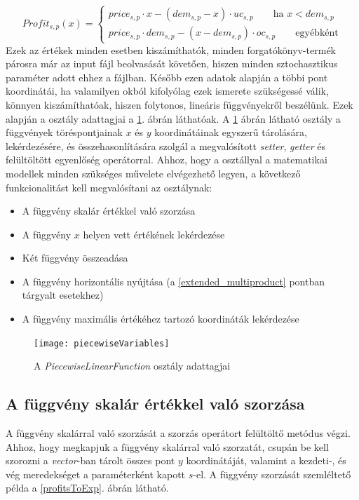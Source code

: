 \begin{equation*}
Profit_{s,p}(x)= \begin{cases}
            price_{s,p}\cdot x-(dem_{s,p}-x) \cdot uc_{s,p}\qquad \text{ha } x<dem_{s,p} \\
            price_{s,p} \cdot dem_{s,p}-(x-dem_{s,p}) \cdot oc_{s,p}\qquad \text{egyébként}
       \end{cases}
\end{equation*}
Ezek az értékek minden esetben kiszámíthatók, minden forgatókönyv-termék párosra már az input fájl beolvasását követően, hiszen minden sztochasztikus paraméter adott ehhez a fájlban.
Később ezen adatok alapján a többi pont koordinátái, ha valamilyen okból kifolyólag ezek ismerete szükségessé válik, könnyen kiszámíthatóak, hiszen folytonos, lineáris függvényekről beszélünk.
Ezek alapján a  osztály adattagjai a \ref{piecewise_variables}. ábrán láthatóak.
A \ref{piecewise_variables} ábrán látható  osztály a függvények töréspontjainak $x$ és $y$ koordinátáinak egyszerű tárolására, lekérdezésére, és összehasonlítására szolgál a megvalósított \textit{setter}, \textit{getter} és felültöltött egyenlőség operátorral.
Ahhoz, hogy a  osztállyal a matematikai modellek minden szükséges művelete elvégezhető legyen, a következő funkcionalitást kell megvalósítani az osztálynak:
\begin{itemize}
\item A függvény skalár értékkel való szorzása
\item A függvény $x$ helyen vett értékének lekérdezése
\item Két függvény összeadása
\item A függvény horizontális nyújtása (a \ref{extended_multiproduct} pontban tárgyalt esetekhez)
\item A függvény maximális értékéhez tartozó koordináták lekérdezése
\end{itemize}
\begin{figure}[H]
\begin{center}
\texttt{[image: piecewiseVariables]}
\caption{A \textit{PiecewiseLinearFunction} osztály adattagjai}
\label{piecewise_variables}
\end{center}
\end{figure}  
\subsection{A függvény skalár értékkel való szorzása} \label{multiplyByScalar}
A függvény skalárral való szorzását a szorzás operátort felültöltő metódus végzi.
Ahhoz, hogy megkapjuk a függvény skalárral való szorzatát, csupán be kell szorozni a \textit{vector}-ban tárolt összes pont $y$ koordinátáját, valamint a kezdeti-, és vég meredekséget a paraméterként kapott $s$-el.
A függvény szorzását szemléltető példa a \ref{profitsToExp}. ábrán látható.
